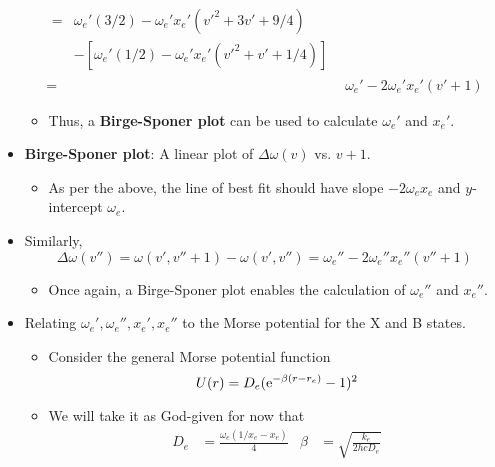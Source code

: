 \documentclass[../notes.tex]{subfiles}
\begin{document}
\begin{itemize}
\begin{align*}
\begin{split}
        \end{split}\\
        \begin{split}
            ={}& \omega_e'(3/2)-\omega_e'x_e'\left( {v'}^2+3v'+9/4 \right)\\
            &-\left[ \omega_e'(1/2)-\omega_e'x_e'\left( {v'}^2+v'+1/4 \right) \right]
        \end{split}\\
        ={}& \omega_e'-2\omega_e'x_e'(v'+1)
    \end{align*}
    \begin{itemize}
        \item Thus, a \textbf{Birge-Sponer plot} can be used to calculate $\omega_e'$ and $x_e'$.
    \end{itemize}
    \item \textbf{Birge-Sponer plot}: A linear plot of $\Delta\omega(v)$ vs. $v+1$.
    \begin{itemize}
        \item As per the above, the line of best fit should have slope $-2\omega_ex_e$ and $y$-intercept $\omega_e$.
    \end{itemize}
    \item Similarly,
    \begin{equation*}
        \Delta\omega(v'') = \omega(v',v''+1)-\omega(v',v'')
        = \omega_e''-2\omega_e''x_e''(v''+1)
    \end{equation*}
    \begin{itemize}
        \item Once again, a Birge-Sponer plot enables the calculation of $\omega_e''$ and $x_e''$.
    \end{itemize}
    \item Relating $\omega_e',\omega_e'',x_e',x_e''$ to the Morse potential for the X and B states.
    \begin{itemize}
        \item Consider the general Morse potential function
        \begin{equation*}
            U(r) = D_e(\e[-\beta(r-r_e)]-1)^2
        \end{equation*}
        \item We will take it as God-given for now that
        \begin{align*}
            D_e &= \frac{\omega_e(1/x_e-x_e)}{4}&
            \beta &= \sqrt{\frac{k_e}{2hcD_e}}
        \end{align*}
        \begin{itemize}

\end{itemize}
\end{itemize}
\end{itemize}
\end{document}
